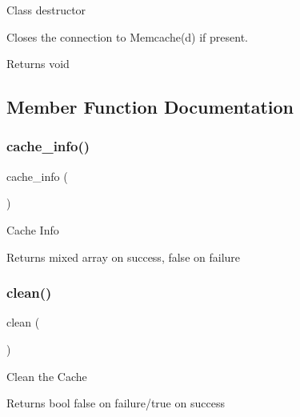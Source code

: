 Class destructor

Closes the connection to Memcache(d) if present.

\begin{DoxyReturn}{Returns}
void 
\end{DoxyReturn}


\subsection{Member Function Documentation}
\mbox{\label{class_c_i___cache__memcached_acb4742926a6fa901e4f0917e1a35ef4c}} 
\subsubsection{\texorpdfstring{cache\+\_\+info()}{cache\_info()}}
{\footnotesize\ttfamily cache\+\_\+info (\begin{DoxyParamCaption}{ }\end{DoxyParamCaption})}

Cache Info

\begin{DoxyReturn}{Returns}
mixed array on success, false on failure 
\end{DoxyReturn}
\mbox{\label{class_c_i___cache__memcached_adb40b812890a8bc058bf6b7a0e1a54d9}} 
\subsubsection{\texorpdfstring{clean()}{clean()}}
{\footnotesize\ttfamily clean (\begin{DoxyParamCaption}{ }\end{DoxyParamCaption})}

Clean the Cache

\begin{DoxyReturn}{Returns}
bool false on failure/true on success 
\end{DoxyReturn}
\mbox{\label{class_c_i___cache__memcached_a4eb1c2772c8efc48c411ea060dd040b7}} 
